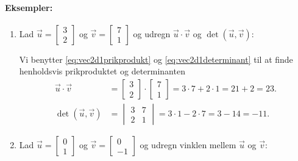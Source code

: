 \paragraph*{Eksempler:}
\begin{enumerate}
\item Lad $\vec{u}= \begin{bmatrix} 3 \\ 2 \end{bmatrix}$ og $\vec{v}= \begin{bmatrix} 7 \\ 1 \end{bmatrix}$ og udregn $\vec{u}\cdot \vec{v}$ og $\det(\vec{u},\vec{v})$:

Vi benytter \eqref{eq:vec2d1prikprodukt} og \eqref{eq:vec2d1determinant} til at finde henholdsvis prikproduktet og determinanten
\begin{align*}
\vec{u}\cdot \vec{v} &=\begin{bmatrix} 3 \\ 2 \end{bmatrix}\cdot  \begin{bmatrix} 7 \\ 1 \end{bmatrix} = 3 \cdot 7 + 2 \cdot 1 = 21+2 = 23.\\
\det(\vec{u},\vec{v})&=\begin{vmatrix}
3 & 7 \\
2 & 1
\end{vmatrix}
=3 \cdot 1 - 2 \cdot 7 = 3-14=-11.
\end{align*}
\item Lad $\vec{u}= \begin{bmatrix} 0 \\ 1 \end{bmatrix}$ og $\vec{v}= \begin{bmatrix} 0 \\ -1 \end{bmatrix}$ og udregn vinklen mellem $\vec{u}$ og $\vec{v}$:


\end{enumerate}
